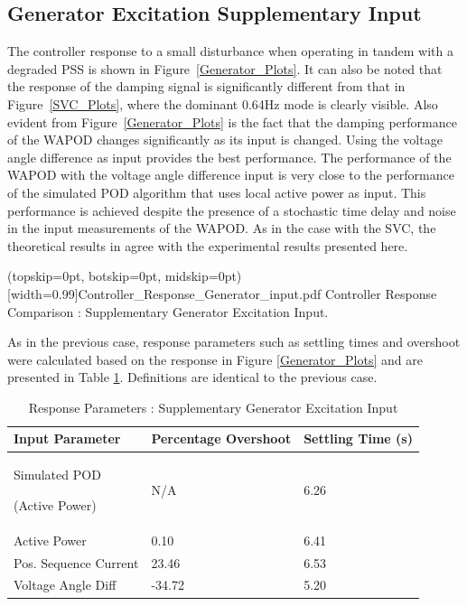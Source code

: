 \documentclass{ieeeaccess}
\begin{document}
\subsection{Generator Excitation Supplementary Input}
The controller response to a small disturbance when operating in tandem with a degraded PSS is shown in Figure~\ref{Generator_Plots}. It can also be noted that the response of the damping signal is significantly different from that in Figure~\ref{SVC_Plots}, where the dominant 0.64Hz mode is clearly visible. Also evident from Figure~\ref{Generator_Plots} is the fact that the damping performance of the WAPOD changes significantly as its input is changed. Using the voltage angle difference as input provides the best performance. The performance of the WAPOD with the voltage angle difference input is very close to the performance of the simulated POD algorithm that uses local active power as input. This performance is achieved despite the presence of a stochastic time delay and noise in the input measurements of the WAPOD. As in the case with the SVC, the theoretical results in \cite{Yuwa} agree with the experimental results presented here.

\Figure[tbp](topskip=0pt, botskip=0pt, midskip=0pt)[width=0.99\columnwidth]{Controller_Response_Generator_input.pdf}
{Controller Response Comparison : Supplementary Generator Excitation Input.\label{Generator_Plots}}

As in the previous case, response parameters such as settling times and overshoot were calculated based on the response in Figure \ref{Generator_Plots} and are presented in Table \ref{GENResponseTable}. Definitions are identical to the previous case.

\begin{table}[htp]
\caption{Response Parameters : Supplementary Generator Excitation Input}\label{GENResponseTable}
\begin{center}
\begin{tabular}{|p{80pt}|p{60pt}|p{60pt}|}
\hline \textbf{Input Parameter} & \textbf{Percentage Overshoot} & \textbf{Settling Time (s)} \\
\hline Simulated POD \par (Active Power) & N/A & 6.26\\ 
\hline Active Power & 0.10 & 6.41\\ 
\hline Pos. Sequence Current & 23.46 & 6.53 \\ 
\hline Voltage Angle Diff & -34.72 & 5.20 \\ 
\hline 
\end{tabular}
\end{center}
\end{table}
\end{document}
